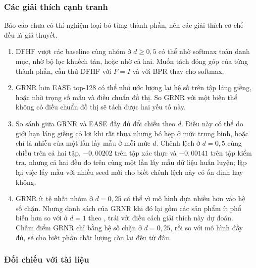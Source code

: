 \FloatBarrier
\subsubsection{Các giải thích cạnh tranh}
 Báo cáo chưa có thí nghiệm loại bỏ từng thành phần, nên các giải thích cơ chế đều là giả thuyết.
\begin{enumerate}[label=(\roman*)]
\item DFHF vượt các baseline cùng nhóm ở $d\ge0{,}5$ có thể nhờ softmax toàn danh mục, nhờ bộ lọc khuếch tán, hoặc nhờ cả hai. Muốn tách đóng góp của từng thành phần, cần thử DFHF với $F=I$ và với BPR thay cho softmax.
\item GRNR hơn EASE top-128 có thể nhờ ước lượng lại hệ số trên tập láng giềng, hoặc nhờ trọng số mẫu và điều chuẩn đồ thị. So GRNR với một biến thể không có điều chuẩn đồ thị sẽ tách được hai yếu tố này.
\item So sánh giữa GRNR và EASE đầy đủ đổi chiều theo $d$. Điều này có thể do giới hạn láng giềng có lợi khi rất thưa nhưng bó hẹp ở mức trung bình, hoặc chỉ là nhiễu của một lần lấy mẫu ở mỗi mức $d$. Chênh lệch ở $d=0{,}5$ cùng chiều trên cả hai tập, $-0{,}00202$ trên tập xác thực và $-0{,}00141$ trên tập kiểm tra, nhưng cả hai đều đo trên cùng một lần lấy mẫu dữ liệu huấn luyện; lặp lại việc lấy mẫu với nhiều seed mới cho biết chênh lệch này có ổn định hay không.
\item GRNR ít tệ nhất nhóm ở $d=0{,}25$ có thể vì mô hình dựa nhiều hơn vào hệ số chặn. Nhưng danh sách của GRNR khi đó lại gồm các sản phẩm ít phổ biến hơn so với ở $d=1$ theo , trái với điều cách giải thích này dự đoán. Chấm điểm GRNR chỉ bằng hệ số chặn ở $d=0{,}25$, rồi so với mô hình đầy đủ, sẽ cho biết phần chất lượng còn lại đến từ đâu.
\end{enumerate}

\FloatBarrier
\subsubsection{Đối chiếu với tài liệu}

